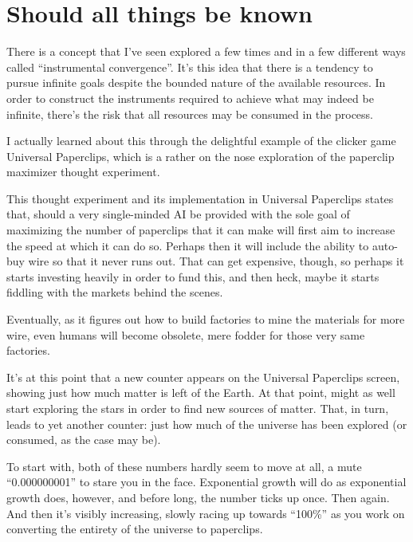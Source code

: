 \hypertarget{should-all-things-be-known}{%
\section*{Should all things be known}\label{should-all-things-be-known}}

There is a concept that I've seen explored a few times and in a few different ways called ``instrumental convergence''. It's this idea that there is a tendency to pursue infinite goals despite the bounded nature of the available resources. In order to construct the instruments required to achieve what may indeed be infinite, there's the risk that all resources may be consumed in the process.

I actually learned about this through the delightful example of the clicker game Universal Paperclips, which is a rather on the nose exploration of the paperclip maximizer thought experiment.

This thought experiment and its implementation in Universal Paperclips states that, should a very single-minded AI be provided with the sole goal of maximizing the number of paperclips that it can make will first aim to increase the speed at which it can do so. Perhaps then it will include the ability to auto-buy wire so that it never runs out. That can get expensive, though, so perhaps it starts investing heavily in order to fund this, and then heck, maybe it starts fiddling with the markets behind the scenes.

Eventually, as it figures out how to build factories to mine the materials for more wire, even humans will become obsolete, mere fodder for those very same factories.

It's at this point that a new counter appears on the Universal Paperclips screen, showing just how much matter is left of the Earth. At that point, might as well start exploring the stars in order to find new sources of matter. That, in turn, leads to yet another counter: just how much of the universe has been explored (or consumed, as the case may be).

To start with, both of these numbers hardly seem to move at all, a mute ``0.000000001'' to stare you in the face. Exponential growth will do as exponential growth does, however, and before long, the number ticks up once. Then again. And then it's visibly increasing, slowly racing up towards ``100\%'' as you work on converting the entirety of the universe to paperclips.

